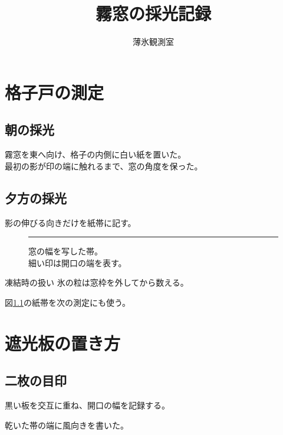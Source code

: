 \documentclass[a4paper,10pt,oneside]{ltjsreport}
\title{霧窓の採光記録}
\author{薄氷観測室}
\date{}
\begin{document}
\pagestyle{empty}
\maketitle
\thispagestyle{empty}
\tableofcontents
\clearpage
\pagestyle{fancy}
\chapter{格子戸の測定}
\section{朝の採光}
霧窓を東へ向け、格子の内側に白い紙を置いた。\\
最初の影が印の端に触れるまで、窓の角度を保った。
\section{夕方の採光}
影の伸びる向きだけを紙帯に記す。
\begin{figure}[htbp]
\centering\rule{36mm}{8mm}
\caption[窓の幅を写した帯]{窓の幅を写した帯。\\細い印は開口の端を表す。}\label{fig:band}
\end{figure}
\begin{observation}{凍結時の扱い}
氷の粒は窓枠を外してから数える。
\end{observation}
\newpage
図\ref{fig:band}の紙帯を次の測定にも使う。
\chapter{遮光板の置き方}
\section{二枚の目印}
黒い板を交互に重ね、開口の幅を記録する。
\begin{tcolorbox}[enhanced,breakable,title={保管用の帯},before skip=8pt,after skip=6pt]
乾いた帯の端に風向きを書いた。
\end{tcolorbox}
\end{document}
